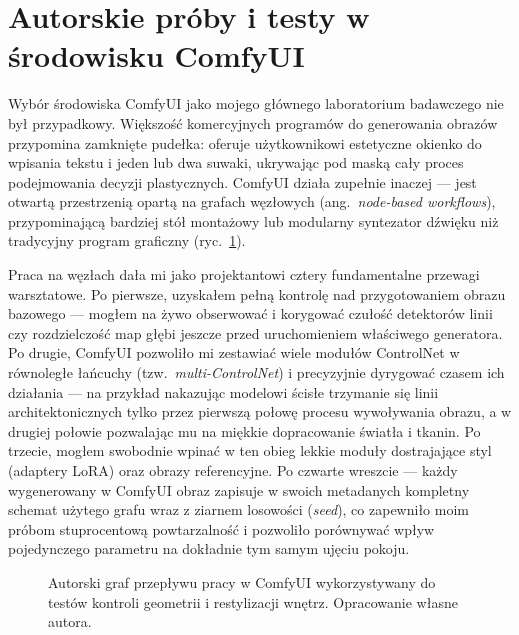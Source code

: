 \section{Autorskie próby i testy w środowisku ComfyUI}
\label{ch04:sec:comfyui-proby}

Wybór środowiska ComfyUI jako mojego głównego laboratorium badawczego nie był przypadkowy. Większość komercyjnych programów do generowania obrazów przypomina zamknięte pudełka: oferuje użytkownikowi estetyczne okienko do wpisania tekstu i jeden lub dwa suwaki, ukrywając pod maską cały proces podejmowania decyzji plastycznych. ComfyUI działa zupełnie inaczej --- jest otwartą przestrzenią opartą na grafach węzłowych (ang.\ \emph{node-based workflows}), przypominającą bardziej stół montażowy lub modularny syntezator dźwięku niż tradycyjny program graficzny (ryc.~\ref{fig:ch04:comfyui-graph}).

Praca na węzłach dała mi jako projektantowi cztery fundamentalne przewagi warsztatowe. Po pierwsze, uzyskałem pełną kontrolę nad przygotowaniem obrazu bazowego --- mogłem na żywo obserwować i korygować czułość detektorów linii czy rozdzielczość map głębi jeszcze przed uruchomieniem właściwego generatora. Po drugie, ComfyUI pozwoliło mi zestawiać wiele modułów ControlNet w równoległe łańcuchy (tzw.\ \emph{multi-ControlNet}) i precyzyjnie dyrygować czasem ich działania --- na przykład nakazując modelowi ścisłe trzymanie się linii architektonicznych tylko przez pierwszą połowę procesu wywoływania obrazu, a w drugiej połowie pozwalając mu na miękkie dopracowanie światła i tkanin. Po trzecie, mogłem swobodnie wpinać w ten obieg lekkie moduły dostrajające styl (adaptery LoRA) oraz obrazy referencyjne. Po czwarte wreszcie --- każdy wygenerowany w ComfyUI obraz zapisuje w swoich metadanych kompletny schemat użytego grafu wraz z ziarnem losowości (\emph{seed}), co zapewniło moim próbom stuprocentową powtarzalność i pozwoliło porównywać wpływ pojedynczego parametru na dokładnie tym samym ujęciu pokoju.

\begin{figure}[htbp]
  \centering
  \caption{Autorski graf przepływu pracy w ComfyUI wykorzystywany do testów kontroli geometrii i restylizacji wnętrz.
  Opracowanie własne autora.}
  \label{fig:ch04:comfyui-graph}
\end{figure}

